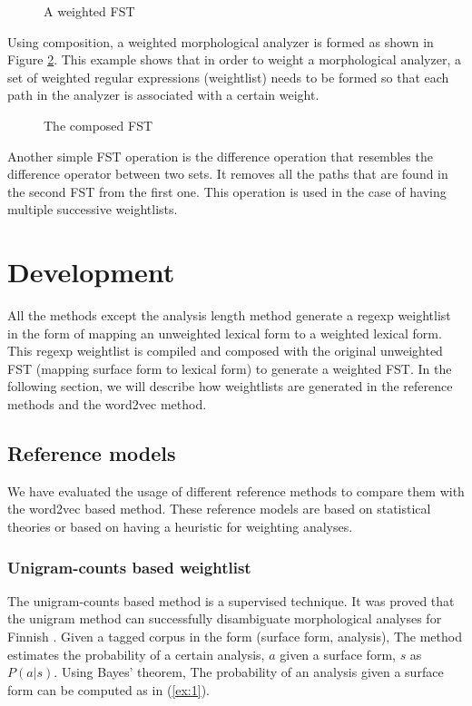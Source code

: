 \documentclass[free]{flammie}
\begin{document}
\begin{figure}
\caption{\label{fig:regex-fst} A weighted FST}
\end{figure}

Using composition, a weighted morphological analyzer is formed as shown in
Figure \ref{fig:weighted-fst}. This example shows that in order to weight a
morphological analyzer, a set of weighted regular expressions (weightlist) needs
to be formed so that each path in the analyzer is associated with a certain
weight.

\begin{figure}
\caption{\label{fig:weighted-fst} The composed FST}
\end{figure}

Another simple FST operation is the difference operation that resembles the
difference operator between two sets. It removes all the paths that are found in
the second FST from the first one. This operation is used in the case of having
multiple successive weightlists.

\section{Development}
All the methods except the analysis length method generate a regexp weightlist
in the form of mapping an unweighted lexical form to a weighted lexical form.
This regexp weightlist is compiled and composed with the original unweighted FST
(mapping surface form to lexical form) to generate a weighted FST.
In the following section, we will describe how weightlists are generated in the
reference methods and the word2vec method.

\subsection{Reference models}
We have evaluated the usage of different reference methods to compare them with
the word2vec based method. These reference models are based on statistical
theories or based on having a heuristic for weighting analyses.

\subsubsection{Unigram-counts based weightlist}
The unigram-counts based method is a supervised technique. It was proved that
the unigram method can successfully disambiguate morphological analyses for
Finnish \cite{linden2009weighting}.
Given a tagged corpus in the form  (surface form, analysis), The method
estimates the probability of a certain analysis, \(a\) given a surface form,
\(s\) as \(P(a|s)\). Using Bayes' theorem, The probability of an analysis given
a surface form can be computed as in (\ref{ex:1}).
\end{document}
